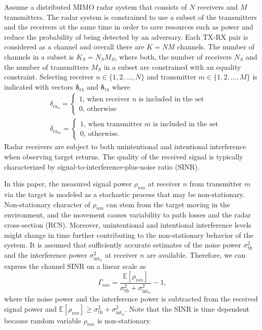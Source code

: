 \documentclass[conference]{IEEEtran}
\newcommand{\thnoise}{\sigma^2_{\text{th}}}
\newcommand{\eintnoise}{\sigma^2_{\text{int}_{n}}}
\newcommand{\esinrexp}{\Gamma_{nm}}
\newcommand{\E}[1]{\mathbb{E}\left[ #1 \right]}
\newcommand{\easvtx}{\delta_{\text{tx}_m}}
\newcommand{\vasvtx}{\boldsymbol{\delta}_{\text{tx}}}
\newcommand{\easvrx}{\delta_{\text{rx}_n}}
\newcommand{\vasvrx}{\boldsymbol{\delta}_{\text{rx}}}
\newcommand{\esp}{\rho_{nm}}
\begin{document}
Assume a distributed MIMO radar system that consists of $N$ receivers and $M$ transmitters.
The radar system is constrained to use a subset of the transmitters and the receivers at the same time in order to save resources such as power and reduce the probability of being detected by an adversary.
Each TX-RX pair is considered as a channel and overall there are $K=NM$ channels.
The number of channels in a subset is $K_S = N_S M_S$, where both, the number of receivers $N_S$ and the number of transmitters $M_S$ in a subset are constrained with an equality constraint.
Selecting receiver $n \in \{1, 2, ..., N\}$ and transmitter $m \in \{1,2, ..., M\}$ is indicated with vectors $\vasvrx$ and $\vasvtx$ where
\begin{align}
    &\easvrx = 
    \left\{\begin{array}{l}
        1 \text{, when receiver $n$ is included in the set} \\
        0 \text{, otherwise}
    \end{array}\right.\\
    &\easvtx = 
    \left\{\begin{array}{l}
        1 \text{, when transmitter $m$ is included in the set} \\
        0 \text{, otherwise.}
    \end{array}\right.
\end{align}
Radar receivers are subject to both unintentional and intentional interference when observing target returns.
The quality of the received signal is typically characterized by signal-to-interference-plus-noise ratio (SINR).

In this paper, the measured signal power $\esp$ at receiver $n$ from transmitter $m$ via the target is modeled as a stochastic process that may be non-stationary. 
Non-stationary character of $\esp$ can stem from the target moving in the environment, and 
the movement causes variability to path losses and the radar cross-section (RCS).
Moreover, unintentional and intentional interference levels might change in time further contributing to the non-stationary behavior of the system.
It is assumed that sufficiently accurate estimates of the noise power $\thnoise$ and the interference power $\eintnoise$ at receiver $n$ are available.
Therefore, we can express the channel SINR on a linear scale as
\begin{equation}\label{eq:sinr}
     \esinrexp = \frac{\E{\esp}}{\thnoise + \eintnoise } - 1,
\end{equation}
where the noise power and the interference power is subtracted from the received signal power and $\E{\esp} \geq \thnoise + \eintnoise$.
Note that the SINR is time dependent because random variable $\esp$ is non-stationary. 
\end{document}
